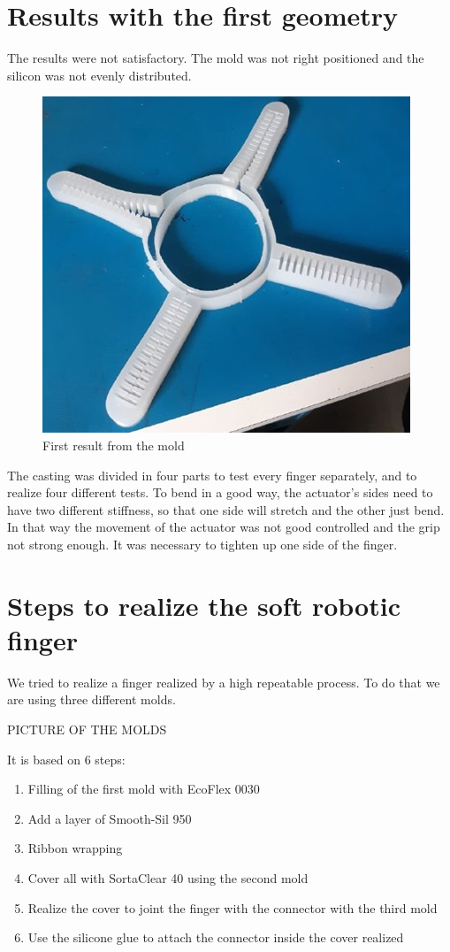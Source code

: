 \documentclass{article}
\begin{document}
\section{Results with the first geometry}

The results were not satisfactory. The mold was not right positioned and the silicon was not evenly distributed. 
\begin{figure}[h]
    \centering
    \includegraphics[scale=0.5]{Pictures/FirstResult.jpg}
    \caption{First result from the mold}
    \label{fig:firstMold}
\end{figure}

The casting was divided in four parts to test every finger separately, and to realize four different tests.
To bend in a good way, the actuator’s sides need to have two different stiffness, so that one side will stretch and the other just bend. In that way the movement of the actuator was not good controlled and the grip not strong enough. It was necessary to tighten up one side of the finger.

\section{Steps to realize the soft robotic finger}
We tried to realize a finger realized by a high repeatable process.
To do that we are using three different molds. 

PICTURE OF THE MOLDS

It is based on 6 steps:
\begin{enumerate}
\item Filling of the first mold with EcoFlex 0030
\item Add a layer of Smooth-Sil 950
\item Ribbon wrapping
\item Cover all with SortaClear 40 using the second mold
\item Realize the cover to joint the finger with the connector with the third mold
\item Use the silicone glue to attach the connector inside the cover realized
\end{enumerate}
\end{document}

